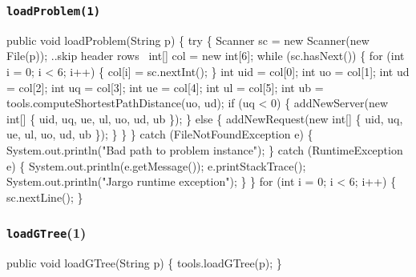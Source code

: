 \documentclass{article}
\def\nwendcode{\endtrivlist \endgroup}      %
\let\nwdocspar=\par
\begin{document}
\subsubsection{{\tt{}\protect{}loadProblem(1)}}
\nwenddocs{}\endmoddef{}
public void loadProblem(String p) \{
  try \{
    Scanner sc = new Scanner(new File(p));
    \LA{}..skip header rows~{\nwtagstyle{}}\RA{}
    int[] col = new int[6];
    while (sc.hasNext()) \{
      for (int i = 0; i < 6; i++) \{
        col[i] = sc.nextInt();
      \}
      int uid = col[0];
      int uo = col[1];
      int ud = col[2];
      int uq = col[3];
      int ue = col[4];
      int ul = col[5];
      int ub = tools.computeShortestPathDistance(uo, ud);
      if (uq < 0) \{
        addNewServer(new int[] \{ uid, uq, ue, ul, uo, ud, ub \});
      \} else \{
        addNewRequest(new int[] \{ uid, uq, ue, ul, uo, ud, ub \});
      \}
    \}
  \} catch (FileNotFoundException e) \{
    System.out.println("Bad path to problem instance");
  \} catch (RuntimeException e) \{
    System.out.println(e.getMessage());
    e.printStackTrace();
    System.out.println("Jargo runtime exception");
  \}
\}
\eatline
{}\nwendcode{}\endmoddef{}
for (int i = 0; i < 6; i++) \{
  sc.nextLine();
\}
\nwendcode{}\nwdocspar

\subsubsection{{\tt{}\protect{}loadGTree}(1)}
\nwenddocs{}\endmoddef{}
public void loadGTree(String p) \{
  tools.loadGTree(p);
\}
\eatline
{}\nwendcode{}\nwdocspar
\end{document}

